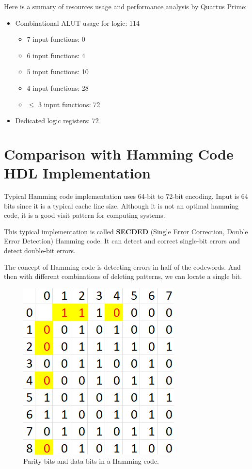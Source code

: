 \documentclass[conference]{IEEEtran}
\begin{document}
Here is a smmary of resources usage and performance analysis by Quartus Prime:
\begin{itemize}
  \item Combinational ALUT usage for logic: 114 \begin{itemize}
    \item 7 input functions: 0
    \item 6 input functions: 4
    \item 5 input functions: 10
    \item 4 input functions: 28
    \item $\leq$ 3 input functions: 72
  \end{itemize}
  \item Dedicated logic registers: 72
\end{itemize}

\section{Comparison with Hamming Code HDL Implementation}
Typical Hamming code implementation uses 64-bit to 72-bit encoding. Input is 64
bits since it is a typical cache line size. Although it is not an optimal
hamming code, it is a good visit pattern for computing systems.

This typical implementation is called \textbf{SECDED} (Single Error Correction,
Double Error Detection) Hamming code. It can detect and correct single-bit
errors and detect double-bit errors.

The concept of Hamming code is detecting errors in half of the codewords. And
then with different combinations of deleting patterns, we can locate a single
bit.

\begin{figure}[htbp]
  \centerline{\includegraphics{Images/Hamming_example.png}}
  \caption{Parity bits and data bits in a Hamming code.}
  \label{fig_2}
\end{figure}
\end{document}
